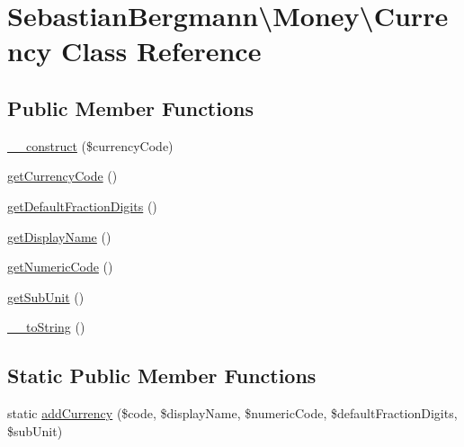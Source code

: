 \hypertarget{classSebastianBergmann_1_1Money_1_1Currency}{}\section{Sebastian\+Bergmann\textbackslash{}Money\textbackslash{}Currency Class Reference}
\label{classSebastianBergmann_1_1Money_1_1Currency}
\subsection*{Public Member Functions}
\begin{DoxyCompactItemize}
\item 
\hyperlink{classSebastianBergmann_1_1Money_1_1Currency_afe975f84e8b479055375469f71e4fa5b}{\+\_\+\+\_\+construct} (\$currency\+Code)
\item 
\hyperlink{classSebastianBergmann_1_1Money_1_1Currency_a4ab32fe055c445eaf8ab40edd41eba8f}{get\+Currency\+Code} ()
\item 
\hyperlink{classSebastianBergmann_1_1Money_1_1Currency_af251b45afbf808f12e32ffde785cd0c3}{get\+Default\+Fraction\+Digits} ()
\item 
\hyperlink{classSebastianBergmann_1_1Money_1_1Currency_a07106701e9a6d8498c05e1807bd0b91c}{get\+Display\+Name} ()
\item 
\hyperlink{classSebastianBergmann_1_1Money_1_1Currency_a4677bf160dd6f4ba40b773c40ed93aa5}{get\+Numeric\+Code} ()
\item 
\hyperlink{classSebastianBergmann_1_1Money_1_1Currency_a9a59ab551c29ac49ffe9e575334d1470}{get\+Sub\+Unit} ()
\item 
\hyperlink{classSebastianBergmann_1_1Money_1_1Currency_a1df79154ee65743ea10d076a88cebc6e}{\+\_\+\+\_\+to\+String} ()
\end{DoxyCompactItemize}
\subsection*{Static Public Member Functions}
\begin{DoxyCompactItemize}
\item 
static \hyperlink{classSebastianBergmann_1_1Money_1_1Currency_ab8e1c72902a3af3dffcab39bcf2ba3da}{add\+Currency} (\$code, \$display\+Name, \$numeric\+Code, \$default\+Fraction\+Digits, \$sub\+Unit)
\end{DoxyCompactItemize}


